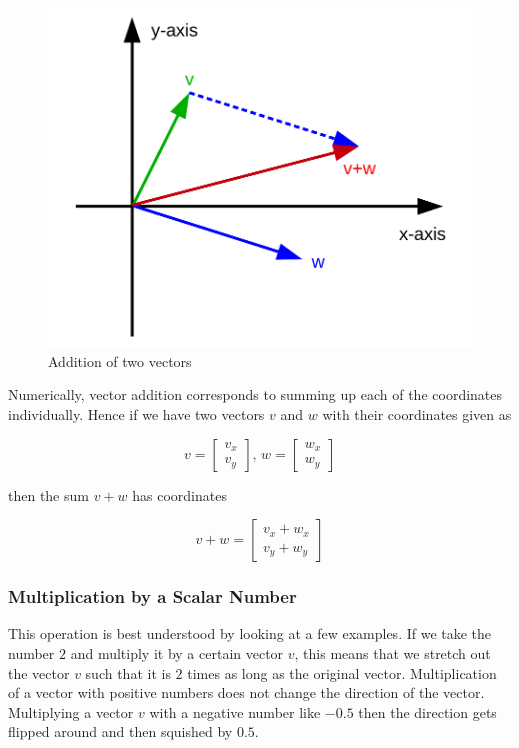 \documentclass[
]{book}
\begin{document}
\begin{figure}[!ht]
\includegraphics[width=1\linewidth,]{odg/vector-sum} \caption{Addition of two vectors}\label{fig:vector-sum}
\end{figure}

Numerically, vector addition corresponds to summing up each of the coordinates individually. Hence if we have two vectors \(v\) and \(w\) with their coordinates given as

\[v = \left[\begin{array}{c} v_x \\ v_y \end{array}\right] \text{, } w = \left[\begin{array}{c} w_x \\ w_y \end{array}\right]\]

then the sum \(v+w\) has coordinates

\[v+w =  \left[\begin{array}{c} v_x + w_x \\ v_y+w_y \end{array}\right]\]

\hypertarget{intro-linalg-vector-scalar-multiplication}{%
\subsubsection{Multiplication by a Scalar Number}\label{intro-linalg-vector-scalar-multiplication}}

This operation is best understood by looking at a few examples. If we take the number \(2\) and multiply it by a certain vector \(v\), this means that we stretch out the vector \(v\) such that it is \(2\) times as long as the original vector. Multiplication of a vector with positive numbers does not change the direction of the vector. Multiplying a vector \(v\) with a negative number like \(-0.5\) then the direction gets flipped around and then squished by \(0.5\).
\end{document}
